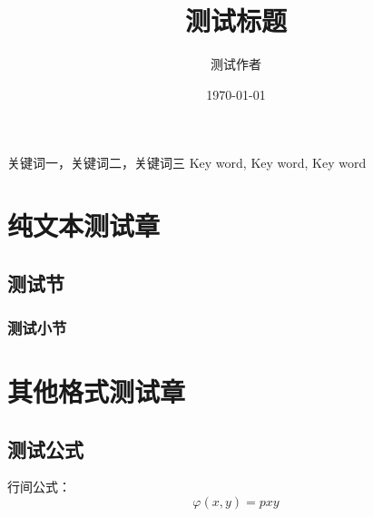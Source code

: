 \documentclass{psythesis}
\title{测试标题}
\author{测试作者}
\date{\today}
\begin{document}
    \maketitle
    \zhabstract{\zhlipsum[1-3][name=xiangyu]}
        {关键词一，关键词二，关键词三}
        {Key word, Key word, Key word}
    
    \PSYtableofcontents

    \section{纯文本测试章}
    \zhlipsum[1][name=xiangyu]
    \subsection{测试节}
    \zhlipsum[2][name=xiangyu]
    \subsubsection{测试小节}
    \zhlipsum[3-8][name=xiangyu]
    
    \section{其他格式测试章}
    \subsection{测试公式}
    行间公式：
    \[
        \varphi(x, y) = pxy
    \]
    \zhlipsum[1][name=xiangyu]
\end{document}

